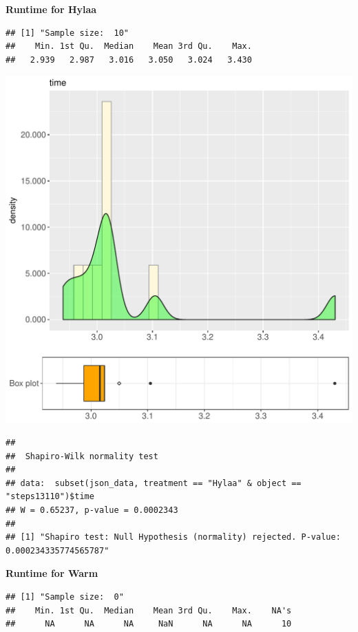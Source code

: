 \documentclass{article}\usepackage[]{graphicx}\usepackage[]{color}
\makeatletter
\def\maxwidth{ %
  \ifdim\Gin@nat@width>\linewidth
    \linewidth
  \else
    \Gin@nat@width
  \fi
}
\newenvironment{kframe}{%
 \def\at@end@of@kframe{}%
 \ifinner\ifhmode%
  \def\at@end@of@kframe{\end{minipage}}%
  \begin{minipage}{\columnwidth}%
 \fi\fi%
 \def\FrameCommand##1{\hskip\@totalleftmargin \hskip-\fboxsep
 \colorbox{shadecolor}{##1}\hskip-\fboxsep
     \hskip-\linewidth \hskip-\@totalleftmargin \hskip\columnwidth}%
 \MakeFramed {\advance\hsize-\width
   \@totalleftmargin\z@ \linewidth\hsize
   \@setminipage}}%
 {\par\unskip\endMakeFramed%
 \at@end@of@kframe}
\newenvironment{knitrout}{}{} %
\makeatother
\begin{document}
 \textbf{Runtime for Hylaa}
\begin{knitrout}
\color{fgcolor}\begin{kframe}
\begin{verbatim}
## [1] "Sample size:  10"
##    Min. 1st Qu.  Median    Mean 3rd Qu.    Max. 
##   2.939   2.987   3.016   3.050   3.024   3.430
\end{verbatim}
\end{kframe}
\includegraphics[width=\maxwidth]{figure/RH1_Hylaa_steps13110-1} 
\begin{kframe}\begin{verbatim}
## 
## 	Shapiro-Wilk normality test
## 
## data:  subset(json_data, treatment == "Hylaa" & object == "steps13110")$time
## W = 0.65237, p-value = 0.0002343
## 
## [1] "Shapiro test: Null Hypothesis (normality) rejected. P-value: 0.000234335774565787"
\end{verbatim}
\end{kframe}
\end{knitrout}
 \textbf{Runtime for Warm}
\begin{knitrout}
\color{fgcolor}\begin{kframe}
\begin{verbatim}
## [1] "Sample size:  0"
##    Min. 1st Qu.  Median    Mean 3rd Qu.    Max.    NA's 
##      NA      NA      NA     NaN      NA      NA      10
\end{verbatim}
\end{kframe}
\end{knitrout}
  
\end{document}
